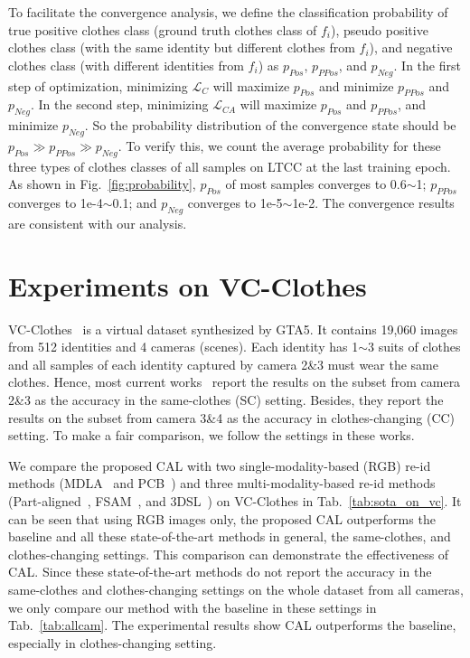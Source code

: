 \documentclass[10pt,twocolumn,letterpaper]{article}
\begin{document}
To facilitate the convergence analysis, we define the classification probability of true positive clothes class (ground truth clothes class of $f_i$), pseudo positive clothes class (with the same identity but different clothes from $f_i$), and negative clothes class (with different identities from $f_i$) as $p_{Pos}$, $p_{PPos}$, and $p_{Neg}$.
In the first step of optimization, minimizing $\mathcal{L}_{C}$ will maximize $p_{Pos}$ and minimize $p_{PPos}$ and $p_{Neg}$. 
In the second step, minimizing $\mathcal{L}_{CA}$ will maximize $p_{Pos}$ and $p_{PPos}$, and minimize $p_{Neg}$. 
So the probability distribution of the convergence state should be $p_{Pos}\gg p_{PPos} \gg p_{Neg}$.
To verify this, we count the average probability for these three types of clothes classes of all samples on LTCC at the last training epoch.
As shown in Fig.~\ref{fig:probability}, $p_{Pos}$ of most samples converges to 0.6$\sim$1; $p_{PPos}$ converges to 1e-4$\sim$0.1; and $p_{Neg}$ converges to 1e-5$\sim$1e-2. The convergence results are consistent with our analysis.





\section{Experiments on VC-Clothes}

VC-Clothes~\cite{Real28} is a virtual dataset synthesized by GTA5.
It contains 19,060 images from 512 identities and 4 cameras (scenes).
Each identity has 1$\sim$3 suits of clothes and all samples of each identity captured by camera 2\&3 must wear the same clothes.
Hence, most current works~\cite{Real28,Hong2021Finegrained} report the results on the subset from camera 2\&3 as the accuracy in the same-clothes (SC) setting.
Besides, they report the results on the subset from camera 3\&4 as the accuracy in clothes-changing (CC) setting.
To make a fair comparison, we follow the settings in these works.

We compare the proposed CAL with two single-modality-based (RGB) re-id methods (\ie MDLA~\cite{Qian2017MS} and PCB~\cite{Sun2018Beyond}) and three multi-modality-based re-id methods (\ie Part-aligned~\cite{Suh2018Part}, FSAM~\cite{Hong2021Finegrained}, and 3DSL~\cite{Chen2021Learning3D}) on VC-Clothes in Tab.~\ref{tab:sota_on_vc}.
It can be seen that using RGB images only, the proposed CAL outperforms the baseline and all these state-of-the-art methods in general, the same-clothes, and clothes-changing settings.
This comparison can demonstrate the effectiveness of CAL.
Since these state-of-the-art methods do not report the accuracy in the same-clothes and clothes-changing settings on the whole dataset from all cameras, we only compare our method with the baseline in these settings in Tab.~\ref{tab:allcam}. The experimental results show CAL outperforms the baseline, especially in clothes-changing setting.
\end{document}
